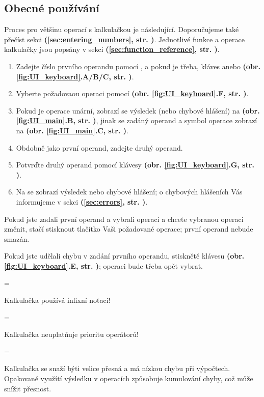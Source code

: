 \documentclass[a5paper,8pt,twoside]{extarticle}
\newenvironment{warningBox}
  {\par\begin{mdframed}[linewidth=1pt,linecolor=black]%
    \begin{list}{}{\leftmargin=1cm
                   \labelwidth=\leftmargin}\item[\Large\warning]}
  {\end{list}\end{mdframed}\par}
\newenvironment{infoBox}
  {\par\begin{mdframed}[linewidth=1pt,linecolor=black]%
    \begin{list}{}{\leftmargin=1cm
                   \labelwidth=\leftmargin}\item[\Large\lefthand]}
  {\end{list}\end{mdframed}\par}
\newcommand*\joinBox{\vspace{-0.9em}}
\newcommand*\nref[1]{\textbf{(\ref{#1}, str. \pageref{#1})}}
\newcommand*\fref[2]{\textbf{(obr. \ref{#1}#2, str. \pageref{#1})}}
\begin{document}
    \newpage

    \subsection{Obecné používání}
    \label{sec:general_use}
    Proces pro většinu operací s kalkulačkou je následující. Doporučujeme také přečíst sekci  \nref{sec:entering_numbers}. Jednotlivé funkce a operace kalkulačky jsou popsány v sekci  \nref{sec:function_reference}.
    \begin{enumerate}
        \item Zadejte číslo prvního operandu pomocí , a pokud je třeba, kláves  anebo  \fref{fig:UI_keyboard}{.A/B/C}.
        \item Vyberte požadovaou operaci pomocí  \fref{fig:UI_keyboard}{.F}.
        \item Pokud je operace unární, zobrazí se výsledek (nebo chybové hlášení) na  \fref{fig:UI_main}{.B}, jinak se zadáný operand a symbol operace zobrazí na  \fref{fig:UI_main}{.C}.
        \item Obdobně jako první operand, zadejte druhý operand.
        \item Potvrďte druhý operand pomocí klávesy  \fref{fig:UI_keyboard}{.G}.
        \item Na  se zobrazí výsledek nebo chybové hlášení; o chybových hlášeních Vás informujeme v sekci \nref{sec:errors}.
    \end{enumerate}
    Pokud jste zadali první operand a vybrali operaci a chcete vybranou operaci změnit, stačí stisknout tlačítko Vaši požadované operace; první operand nebude smazán.

    Pokud jste udělali chybu v zadání prvního operandu, stisknětě klávesu  \fref{fig:UI_keyboard}{.E}; operaci bude třeba opět vybrat.
    \begin{infoBox}
        Kalkulačka používá infixní notaci!
    \end{infoBox}
    \joinBox
    \begin{infoBox}
        Kalkulačka neuplatňuje prioritu operátorů!
    \end{infoBox}
    \joinBox
    \begin{warningBox}
        Kalkulačka se snaží býti velice přesná a má nízkou chybu při výpočtech. Opakované využítí výsledku v operacích způsobuje kumulování chyby, což může snížit přesnost.
    \end{warningBox}
\end{document}

